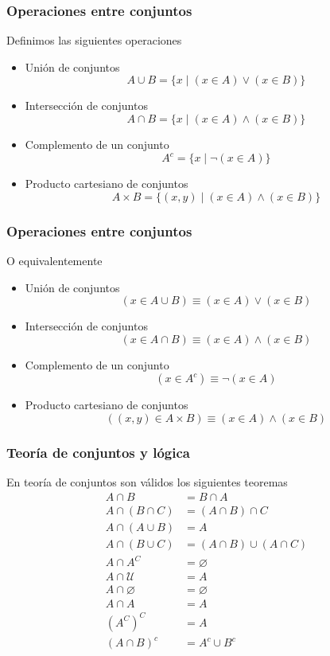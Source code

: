 \documentclass{beamer}
\begin{document}
\begin{frame}[fragile]
    \frametitle{Operaciones entre conjuntos}
    Definimos las siguientes operaciones
    \begin{itemize}
        \item Unión de conjuntos
        $$A \cup B = \{x \mid (x \in A) \lor (x \in B)\}$$
        \item Intersección de conjuntos
        $$A \cap B = \{x \mid (x \in A) \land (x \in B)\}$$
        \item Complemento de un conjunto
        $$A^{c} = \{x \mid \lnot(x \in A)\}$$
        \item Producto cartesiano de conjuntos
        $$A \times B = \{(x, y) \mid (x \in A) \land (x \in B)\}$$
    \end{itemize}
\end{frame}

\begin{frame}[fragile]
    \frametitle{Operaciones entre conjuntos}
    O equivalentemente
    \begin{itemize}
        \item Unión de conjuntos
        $$(x \in A \cup B) \equiv (x \in A) \lor (x \in B)$$
        \item Intersección de conjuntos
        $$(x \in A \cap B) \equiv (x \in A) \land (x \in B)$$
        \item Complemento de un conjunto
        $$(x \in A ^c) \equiv \lnot (x \in A)$$
        \item Producto cartesiano de conjuntos
            $$((x, y) \in A \times B) \equiv (x \in A) \land (x \in B)$$
    \end{itemize}
\end{frame}

\begin{frame}[fragile]
    \frametitle{Teoría de conjuntos y lógica}
    En teoría de conjuntos son válidos los siguientes teoremas
    \begin{align*}
        A \cap B &= B \cap A \\ 
        A \cap (B \cap C) &= (A \cap B) \cap C \\
        A \cap (A \cup B) &= A \\
        A \cap (B \cup C) &= (A \cap B) \cup (A \cap C) \\
        A \cap A^{C} &= \varnothing \\
        A \cap \mathcal{U} &= A \\
        A \cap \varnothing &= \varnothing \\
        A \cap A &= A \\
        (A^C)^C &= A \\
        (A \cap B)^c &= A^c \cup B^c \\
    \end{align*}
\end{frame}
\end{document}
